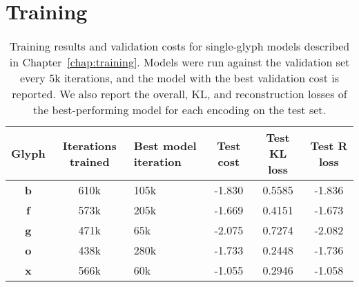 \chapter{Training}\label{app:train}

\begin{table}[h]
\centering
    \caption[Training results for the single-glyph models]{Training results and validation costs for single-glyph models described in Chapter~\ref{chap:training}.
    Models were run against the validation set every 5k iterations, and the model with the best validation cost is reported.
    We also report the overall, KL, and reconstruction losses of the best-performing model for each encoding on the test set.
    \label{apptbl:train-models}}
\begin{tabularx}{\textwidth}{c c X c c c}
\toprule
    Glyph & Iterations trained & Best model iteration & Test cost & Test KL loss & Test R loss \\ \midrule
    \textbf{b} & 610k & 105k & -1.830 & 0.5585 & -1.836 \\
    \textbf{f} & 573k & 205k & -1.669 & 0.4151 & -1.673 \\
    \textbf{g} & 471k & 65k & -2.075 & 0.7274 & -2.082 \\
    \textbf{o} & 438k & 280k & -1.733 & 0.2448 & -1.736 \\
    \textbf{x} & 566k & 60k & -1.055 & 0.2946 & -1.058 \\
\end{tabularx}
\end{table}


